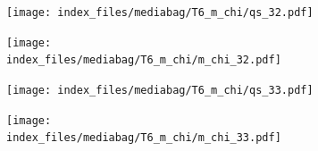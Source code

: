 \documentclass[
  11pt,
  letterpaper,
]{scrreprt}
\begin{document}
\begin{figure}

\begin{minipage}{0.50\linewidth}

\begin{figure}[H]

{\centering \texttt{[image: index\_files/mediabag/T6\_m\_chi/qs\_32.pdf]}

}


\end{figure}%

\end{minipage}%
%
\begin{minipage}{0.50\linewidth}

\begin{figure}[H]

{\centering \texttt{[image: index\_files/mediabag/T6\_m\_chi/m\_chi\_32.pdf]}

}


\end{figure}%

\end{minipage}%

\end{figure}%

\begin{figure}

\begin{minipage}{0.50\linewidth}

\begin{figure}[H]

{\centering \texttt{[image: index\_files/mediabag/T6\_m\_chi/qs\_33.pdf]}

}


\end{figure}%

\end{minipage}%
%
\begin{minipage}{0.50\linewidth}

\begin{figure}[H]

{\centering \texttt{[image: index\_files/mediabag/T6\_m\_chi/m\_chi\_33.pdf]}

}


\end{figure}%

\end{minipage}%

\end{figure}%
\end{document}
